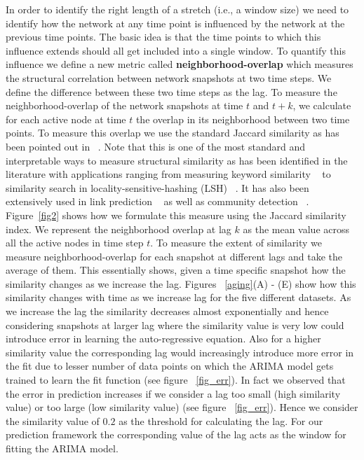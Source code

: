 In order to identify the right length of a stretch (i.e., a window size) we need to identify how the network at any time point is influenced by the network at the previous time points.
The basic idea is that the time points to which this influence extends should all get included into a single window.
To quantify this influence we define a new metric called {\bf neighborhood-overlap} which measures the structural correlation between network snapshots at 
two time steps. We define the difference between these two time steps as the lag. To measure the neighborhood-overlap of the network snapshots at time 
$t$ and $t+k$, we calculate for each active node at time $t$ the overlap in its neighborhood between two time points. 
To measure this overlap we use the 
  standard Jaccard similarity as has been pointed out in ~\cite{TSMML10:smallworld}. Note that this is one of the most standard and interpretable ways to 
  measure structural similarity as has been identified in the literature with applications ranging from measuring keyword similarity ~\cite{niwattanakul2013using} to 
  similarity search in locality-sensitive-hashing (LSH) ~\cite{bawa2005lsh}. It has also been extensively used in link prediction ~\cite{lu2011link,lu2009similarity} 
  as well as community detection ~\cite{pan2010detecting}.
Figure~\ref{fig2} shows how we formulate this measure using the Jaccard similarity index. We represent the neighborhood overlap at lag $k$ as the mean value 
  across all the active nodes in time step $t$. 
  To measure the extent of similarity we measure neighborhood-overlap for each snapshot at different lags and take the average of them. This essentially 
  shows, given a time specific snapshot how the similarity changes as we increase the lag. Figures ~\ref{aging}(A) - (E) show how this similarity 
  changes with time as we increase lag for the five different datasets. 
  As we increase the lag the similarity  
 decreases almost exponentially and hence considering snapshots at larger lag where the similarity value is very low could introduce error in learning the auto-regressive equation. 
 Also for a higher similarity value the corresponding lag would increasingly introduce more error in the fit due to lesser number of data points on which the ARIMA model gets trained
 to learn the fit function (see figure ~\ref{fig_err}).
 In fact we observed that the error in prediction increases if we consider a lag too small (high similarity value) or too large (low similarity value) (see figure ~\ref{fig_err}). 
 Hence we consider the similarity value of $0.2$ as the threshold for calculating the lag. For our prediction framework the corresponding value of the lag acts as 
 the window for fitting the ARIMA model.
  
